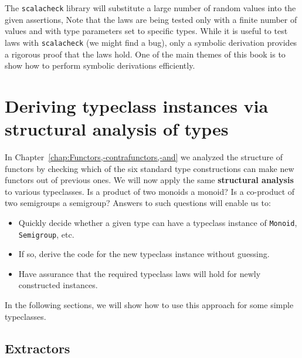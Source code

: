 The \texttt{scalacheck} library will substitute a large number of
random values into the given assertions, Note that the laws are being
tested only with a finite number of values and with type parameters
set to specific types. While it is useful to test laws with \texttt{scalacheck}
(we might find a bug), only a symbolic derivation provides a rigorous
proof that the laws hold. One of the main themes of this book is to
show how to perform symbolic derivations efficiently.

\section{Deriving typeclass instances via structural analysis of types}

In Chapter~\ref{chap:Functors,-contrafunctors,-and} we analyzed
the structure of functors by checking which of the six standard type
constructions can make new functors out of previous ones. We will
now apply the same \textbf{structural
analysis} to various typeclasses. Is a product of two monoids a monoid?
Is a co-product of two semigroups a semigroup? Answers to such questions
will enable us to:
\begin{itemize}
\item Quickly decide whether a given type can have a typeclass instance
of \lstinline!Monoid!, \lstinline!Semigroup!, etc.
\item If so, derive the code for the new typeclass instance without guessing.
\item Have assurance that the required typeclass laws will hold for newly
constructed instances.
\end{itemize}
In the following sections, we will show how to use this approach for
some simple typeclasses.

\subsection{Extractors}


